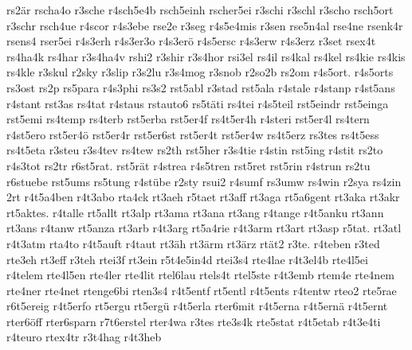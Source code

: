 {    rs2är
    rscha4o
    r3sche
    r4sch5e4b
    rsch5einh
    rscher5ei
    r3schi
    r3schl
    r3scho
    rsch5ort
    r3schr
    rsch4ue
    r4scor
    r4s3ebe
    rse2e
    r3seg
    r4s5e4mis
    r3sen
    rse5n4al
    rse4ne
    rsenk4r
    rsens4
    rser5ei
    r4s3erh
    r4s3er3o
    r4s3erö
    r4s5ersc
    r4s3erw
    r4s3erz
    r3set
    rsex4t
    rs4ha4k
    rs4har
    r3s4ha4v
    rshi2
    r3shir
    r3s4hor
    rsi3el
    rs4il
    rs4kal
    rs4kel
    rs4kie
    rs4kis
    rs4kle
    r3skul
    r2sky
    r3slip
    r3s2lu
    r3s4mog
    r3snob
    r2so2b
    rs2om
    r4s5ort.
    r4s5orts
    rs3ost
    rs2p
    rs5para
    r4s3phi
    rs3s2
    rst5abl
    r3stad
    rst5ala
    r4stale
    r4stanp
    r4st5ans
    r4stant
    rst3as
    rs4tat
    r4staus
    rstauto6
    rs5täti
    rs4tei
    r4s5teil
    rst5eindr
    rst5einga
    rst5emi
    rs4temp
    rs4terb
    rst5erba
    rst5er4f
    rs4t5er4h
    r4steri
    rst5er4l
    rs4tern
    r4st5ero
    rst5er4ö
    rst5er4r
    rst5er6st
    rst5er4t
    rst5er4w
    rs4t5erz
    rs3tes
    rs4t5ess
    rs4t5eta
    r3steu
    r3s4tev
    rs4tew
    rs2th
    rst5her
    r3s4tie
    r4stin
    rst5ing
    r4stit
    rs2to
    r4s3tot
    rs2tr
    r6st5rat.
    rst5rät
    r4strea
    r4s5tren
    rst5ret
    rst5rin
    r4strun
    rs2tu
    r6stuebe
    rst5ums
    rs5tung
    r4stübe
    r2sty
    rsui2
    r4sumf
    rs3umw
    rs4win
    r2sya
    rs4zin
    2rt
    r4t5a4ben
    r4t3abo
    rta4ck
    rt3aeh
    r5taet
    rt3aff
    rt3aga
    rt5a6gent
    rt3aka
    rt3akr
    rt5aktes.
    r4talle
    rt5allt
    rt3alp
    rt3ama
    rt3ana
    rt3ang
    r4tange
    r4t5anku
    rt3ann
    rt3ans
    r4tanw
    rt5anza
    rt3arb
    r4t3arg
    rt5a4rie
    r4t3arm
    rt3art
    rt3asp
    r5tat.
    rt3atl
    r4t3atm
    rta4to
    r4t5auft
    r4taut
    rt3äh
    rt3ärm
    rt3ärz
    rtät2
    r3te.
    r4teben
    r3ted
    rte3eh
    rt3eff
    r3teh
    rtei3f
    rt3ein
    r5t4e5in4d
    rtei3s4
    rte4lae
    r4t3el4b
    rte4l5ei
    r4telem
    rte4l5en
    rte4ler
    rte4lit
    rtel6lau
    rtels4t
    rtel5ste
    r4t3emb
    rtem4e
    rte4nem
    rte4ner
    rte4net
    rtenge6bi
    rten3s4
    r4t5entf
    rt5entl
    r4t5ents
    r4tentw
    rteo2
    rte5rae
    r6t5ereig
    r4t5erfo
    rt5ergu
    rt5ergü
    r4t5erla
    rter6mit
    r4t5erna
    r4t5ernä
    r4t5ernt
    rter6öff
    rter6sparn
    r7t6erstel
    rter4wa
    r3tes
    rte3s4k
    rte5stat
    r4t5etab
    r4t3e4ti
    r4teuro
    rtex4tr
    r3t4hag
    r4t3heb
}
